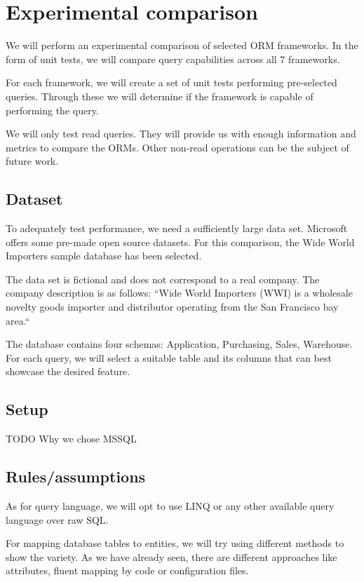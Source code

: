 \chapter{Experimental comparison}

We will perform an experimental comparison of selected ORM frameworks. In the form of unit tests, we will compare query capabilities across all 7 frameworks.

For each framework, we will create a set of unit tests performing pre-selected queries. Through these we will determine if the framework is capable of performing the query. 



We will only test read queries. They will provide us with enough information and metrics to compare the ORMs. Other non-read operations can be the subject of future work.

\section{Dataset}
To adequately test performance, we need a sufficiently large data set. Microsoft offers some pre-made open source datasets.
For this comparison, the Wide World Importers sample database \cite{microsoftWWI} has been selected.

The data set is fictional and does not correspond to a real company. The company description is as follows: ``Wide World Importers (WWI) is a wholesale novelty goods importer and distributor operating from the San Francisco bay area.``\cite{microsoftWWI}

The database contains four schemas: Application, Purchasing, Sales, Warehouse. For each query, we will select a suitable table and its columns that can best showcase the desired feature.

\section{Setup}
TODO Why we chose MSSQL

\section{Rules/assumptions} %
As for query language, we will opt to use LINQ or any other available query language over raw SQL. 

For mapping database tables to entities, we will try using different methods to show the variety. 
As we have already seen, there are different approaches like attributes, fluent mapping by code or configuration files. 

